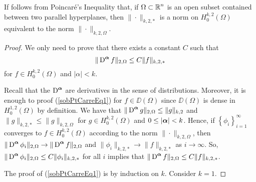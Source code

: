 \begin{rmk}
If follows from Poincaré's Inequality that, if
$\displaystyle \Omega \subset \mathbb{R}^n$ is an open subset contained between two
parallel hyperplanes, then $\|\cdot\|_{k,2,\ast}$ is a norm on
$\displaystyle H^{k,2}_0(\Omega)$ equivalent to the norm
$\|\cdot\|_{k,2,\Omega}$.  \label{ell_equivNorms}
\end{rmk}

\begin{proof}
We only need to prove that there exists a constant $C$ such that
\begin{equation} \label{sobPtCarreEq1}
  \| \operatorname{D}^{{\bm{\alpha}}} f \|_{2,\Omega} \leq C \|f\|_{k,2,\ast}
\end{equation}
for $\displaystyle f \in H^{k,2}_0(\Omega)$ and $|\alpha|<k$.

Recall that the $\displaystyle \operatorname{D}^{{\bm{\alpha}}}$ are derivatives
in the sense of distributions.  Moreover, it is enough to proof
(\ref{sobPtCarreEq1}) for $f \in \DD(\Omega)$ since $\DD(\Omega)$ is dense in
$\displaystyle H^{1,2}_0(\Omega)$
by definition.  We have that
$\displaystyle \| \operatorname{D}^{{\bm{\alpha}}} g \|_{2,\Omega} \leq \|g\|_{k,2}$
and $\displaystyle \|g\|_{k,2,\ast} \leq \|g\|_{k,2,\Omega}$ for
$\displaystyle g \in H^{k,2}_0(\Omega)$ and $0\leq |{\bm{\alpha}}|<k$.  Hence, if
$\displaystyle \left\{\phi_i\right\}_{i=1}^\infty$ converges to 
$\displaystyle f \in H^{k,2}_0(\Omega)$ according to the norm
$\|\cdot\|_{k,2,\Omega}$, then
$\displaystyle \| \operatorname{D}^{{\bm{\alpha}}} \phi_i \|_{2,\Omega}
\rightarrow \| \operatorname{D}^{{\bm{\alpha}}} f \|_{2,\Omega}$
and $\displaystyle \|\phi_i\|_{k,2,\ast} \rightarrow \|f\|_{k,2,\ast}$
as $i\rightarrow \infty$.  So,
$\displaystyle \| \operatorname{D}^{{\bm{\alpha}}} \phi_i \|_{2,\Omega}
\leq C \|\phi_i\|_{k,2,\ast}$ for
all $i$ implies that
$\displaystyle \| \operatorname{D}^{{\bm{\alpha}}} f \|_{2,\Omega} \leq C \|f\|_{k,2,\ast}$.

The proof of (\ref{sobPtCarreEq1}) is by induction on $k$.  Consider $k=1$.


\end{proof}
